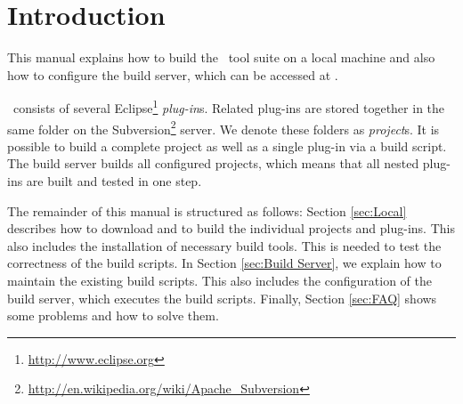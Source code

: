 \section{Introduction}
This manual explains how to build the \EASy\ tool suite on a local machine and also how to configure the build server, which can be accessed at \Jenkins.

\EASy\ consists of several Eclipse\footnote{\url{http://www.eclipse.org}} \textit{plug-in}s. Related plug-ins are stored together in the same folder on the Subversion\footnote{\url{http://en.wikipedia.org/wiki/Apache_Subversion}} server. We denote these folders as \textit{project}s. It is possible to build a complete project as well as a single plug-in via a build script. The build server builds all configured projects, which means that all nested plug-ins are built and tested in one step.

The remainder of this manual is structured as follows: Section \ref{sec:Local} describes how to download and to build the individual projects and plug-ins. This also includes the installation of necessary build tools. This is needed to test the correctness of the build scripts. In Section \ref{sec:Build Server}, we explain how to maintain the existing build scripts. This also includes the configuration of the build server, which executes the build scripts. Finally, Section \ref{sec:FAQ} shows some problems and how to solve them.